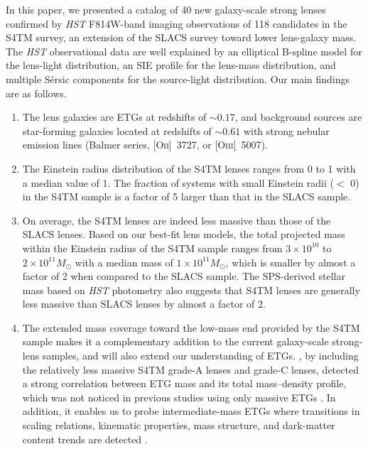 \documentclass{emulateapj}
\begin{document}
In this paper, we presented a catalog of 40 new galaxy-scale strong lenses confirmed by 
\textsl{HST} F814W-band imaging observations of 118 candidates in the S4TM survey, 
an extension of the SLACS survey toward lower lens-galaxy mass. 
The \textsl{HST} observational data are well explained by an elliptical B-spline model 
for the lens-light distribution, an SIE profile for the lens-mass distribution, and 
multiple S\'{e}rsic components for the source-light distribution. Our main findings are as follows. 
\begin{enumerate}
\item The lens galaxies are ETGs at redshifts of $\sim 0.17$, and background sources are 
star-forming galaxies located at redshifts of $\sim 0.61$ with strong nebular emission lines 
(Balmer series, [O\textsc{ii}]~3727, or [O\textsc{iii}]~5007).
\item The Einstein radius distribution of the S4TM lenses ranges from 0 to 1 
with a median value of 1. 
The fraction of systems with small Einstein radii ($<$ 0) in the S4TM sample is 
a factor of 5 larger than that in the SLACS sample.
\item On average, the S4TM lenses are indeed less massive than those of the SLACS lenses. 
Based on our best-fit lens models, the total projected mass within the Einstein radius of 
the S4TM sample ranges from $3 \times 10^{10}$ to $2 \times 10^{11} M_{\odot}$ with 
a median mass of $1 \times 10^{11} M_{\odot}$, which is smaller by almost a factor of 2 
when compared to the SLACS sample. The SPS-derived stellar mass based on 
\textsl{HST} photometry also suggests that S4TM lenses are generally less massive than 
SLACS lenses by almost a factor of 2.
\item The extended mass coverage toward the low-mass end provided by the S4TM sample makes 
it a complementary addition to the current galaxy-scale strong-lens samples, and will also 
extend our understanding of ETGs. \citet{Shu15}, by including the relatively less massive 
S4TM grade-A lenses and grade-C lenses, detected a strong correlation between ETG mass and 
its total mass--density profile, which was not noticed in previous studies using only massive 
ETGs \citep[e.g.,][]{SLACSVII, Koopmans09, Barnabe11, Ruff11}. 
In addition, it enables us to probe intermediate-mass ETGs where transitions in scaling 
relations, kinematic properties, mass structure, and dark-matter content trends are detected 
\citep[e.g.,][]{Tremblay96, Graham03a, Kauffmann03, Graham08, Hyde09, Skelton09, Tortora09, 
vanderWel09, Bernardi11a, Bernardi11b, Cappellari13a, Cappellari13, Montero16}. 
\end{enumerate}
\end{document}
